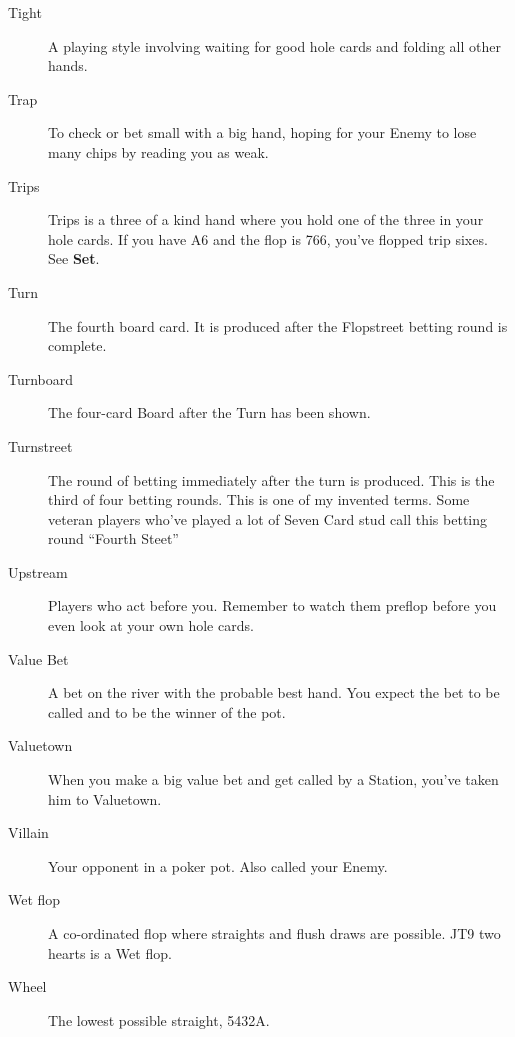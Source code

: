 \begin{description}
\item[Tight] A playing style involving waiting for good hole cards and
folding all other hands.

\item[Trap] To check or bet small with a big hand, hoping for your Enemy
to lose many chips by reading you as weak.

\item[Trips] Trips is a three of a kind hand where you hold one of the
three in your hole cards. If you have A6 and the flop is 766, you've
flopped trip sixes. See \textbf{Set}.

\item[Turn] The fourth board card. It is produced after the Flopstreet
betting round is complete.

\item[Turnboard] The four-card Board after the Turn has been shown.

\item[Turnstreet] The round of betting immediately after the turn is
produced. This is the third of four betting rounds. This is one
of my invented terms. Some veteran players who've played a lot of
Seven Card stud call this betting round ``Fourth Steet''

\item[Upstream] Players who act before you. Remember to watch them
preflop before you even look at your own hole cards.

\item[Value Bet] A bet on the river with the probable best hand. You
expect the bet to be called and to be the winner of the pot.

\item[Valuetown] When you make a big value bet and get called by
a Station, you've taken him to Valuetown.

\item[Villain] Your opponent in a poker pot. Also called your Enemy.

\item[Wet flop] A co-ordinated flop where straights and flush draws
are possible. JT9 two hearts is a Wet flop.

\item[Wheel] The lowest possible straight, 5432A.

\end{description}
